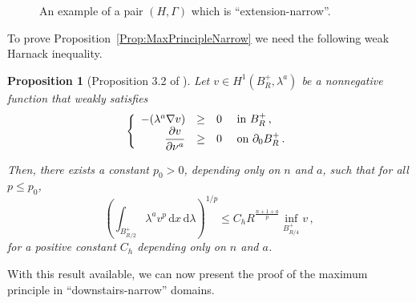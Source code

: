 \documentclass[12pt,reqno]{amsart}
\newtheorem{proposition}[theorem]{Proposition}
\theoremstyle{definition}
\theoremstyle{remark}
\newcommand{\con}[1]{\mathbb{#1}}
\newcommand{\R}{\con{R}} %
\newcommand{\ccal}{\mathscr{C}}
\newcommand{\ocal}{\mathcal{O}}
\renewcommand{\d}{\,\mathrm{d}} %
\newcommand{\dx}{\,\mathrm{d}x} %
\newcommand\beqc[1]{\left\{\begin{array}{#1}}
\newcommand\eeqc{\end{array} \right.}
\def\PDEsystem{rcll}
\let\div\relax
\DeclareMathOperator{\div}{div}
\numberwithin{equation}{section}
\begin{document}

\begin{figure}

\caption{An example of a pair $(H,\Gamma)$ which is ``extension-narrow''\!.}
\label{Fig:ExtensionNarrow}
\end{figure}


To prove Proposition~\ref{Prop:MaxPrincipleNarrow} we need the following weak Harnack inequality.

\begin{proposition}[Proposition 3.2 of \cite{TanXiong}]
	\label{Prop:WeakHarnack}
	Let $v \in H^1(B_R^+, \lambda^a)$ be a nonnegative function that weakly satisfies 
	$$
	\beqc{\PDEsystem}
	-\div(\lambda^a \nabla v) &\geq& 0 & \textrm{ in } B_R^+\,, \\
	\dfrac{\partial v}{\partial \nu^a} &\geq & 0 & \textrm{ on }  \partial_0 B_R^+\,.
	\eeqc
	$$
	
	Then, there exists a constant $p_0 > 0$, depending only on $n$ and $a$, such that for all $p\leq p_0$,
	\begin{equation}
	\label{Eq:WeakHarnack}
	\left( \int_{B_{R/2}^+} \lambda^a v^p \dx \d \lambda \right )^{1/p} \leq C_h R^{\frac{n+1+a}{p} } \inf_{B^+_{R/4}} v\,,
	\end{equation}
	for a positive constant $C_h$ depending only on $n$ and $a$.
\end{proposition}

With this result available, we can now present the proof of the maximum principle in ``downstairs-narrow'' domains.
\end{document}
